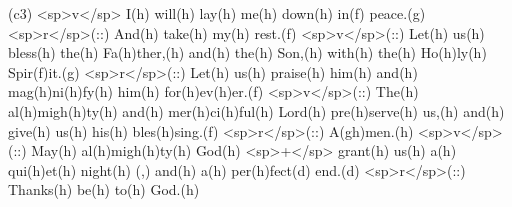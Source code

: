 (c3) <sp>v</sp> I(h) will(h) lay(h) me(h) down(h) in(f) peace.(g) <sp>r</sp>(::) And(h) take(h) my(h) rest.(f) <sp>v</sp>(::) Let(h) us(h) bless(h) the(h) Fa(h)ther,(h) and(h) the(h) Son,(h) with(h) the(h) Ho(h)ly(h) Spir(f)it.(g) <sp>r</sp>(::) Let(h) us(h) praise(h) him(h) and(h) mag(h)ni(h)fy(h) him(h) for(h)ev(h)er.(f) <sp>v</sp>(::) The(h) al(h)migh(h)ty(h) and(h) mer(h)ci(h)ful(h) Lord(h) pre(h)serve(h) us,(h) and(h) give(h) us(h) his(h) bles(h)sing.(f) <sp>r</sp>(::) A(gh)men.(h) <sp>v</sp>(::) May(h) al(h)migh(h)ty(h) God(h) <sp>+</sp> grant(h) us(h) a(h) qui(h)et(h) night(h) (,) and(h) a(h) per(h)fect(d) end.(d) <sp>r</sp>(::) Thanks(h) be(h) to(h) God.(h)